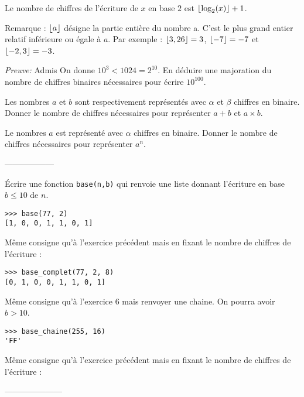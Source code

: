 \begin{propriété}{}
Le nombre de chiffres de l'écriture de $x$ en base $2$ est $\left\lfloor  \log_2(x) \right\rfloor+1$.
\end{propriété}

Remarque : $\left\lfloor a \right\rfloor$ désigne la partie entière du nombre a. C'est le plus grand entier relatif inférieure ou égale à $a$. Par exemple : $\left\lfloor 3,26 \right\rfloor = 3$, $\left\lfloor -7 \right\rfloor = -7$ et $\left\lfloor -2,3 \right\rfloor = -3$.

{\it Preuve: } Admis
\exercice{}
On donne $10^3 < 1024 = 2^{10}$. En déduire une majoration du nombre de chiffres binaires nécessaires pour écrire $10^{100}$.


\exercice{}

Les nombres $a$ et $b$ sont respectivement représentés avec $\alpha$ et $\beta$ chiffres en binaire. Donner le nombre de chiffres nécessaires pour représenter $a+b$ et $a\times b$.


\entrainement{}

Le nombres $a$ est représenté avec $\alpha$ chiffres en binaire. Donner le nombre de chiffres nécessaires pour représenter $a^n$.
\begin{center}
	------------------
\end{center}
\exercice{}

\'Ecrire une fonction \verb!base(n,b)! qui renvoie une liste donnant l'écriture en base $b \leqslant 10$ de $n$.


\begin{lstlisting}
>>> base(77, 2)
[1, 0, 0, 1, 1, 0, 1]
\end{lstlisting}

\entrainement{}

Même consigne qu'à l'exercice précédent mais en fixant le nombre de chiffres de l'écriture :
\begin{lstlisting}
>>> base_complet(77, 2, 8)
[0, 1, 0, 0, 1, 1, 0, 1]
\end{lstlisting}
\bigskip

\exercice{}

Même consigne qu'à l'exercice 6 mais renvoyer une chaine. On pourra avoir $b>10$.

\begin{lstlisting}
>>> base_chaine(255, 16)
'FF'
\end{lstlisting}


\entrainement{}

Même consigne qu'à l'exercice précédent mais en fixant le nombre de chiffres de l'écriture :
\begin{center}
	---------------------
\end{center}

